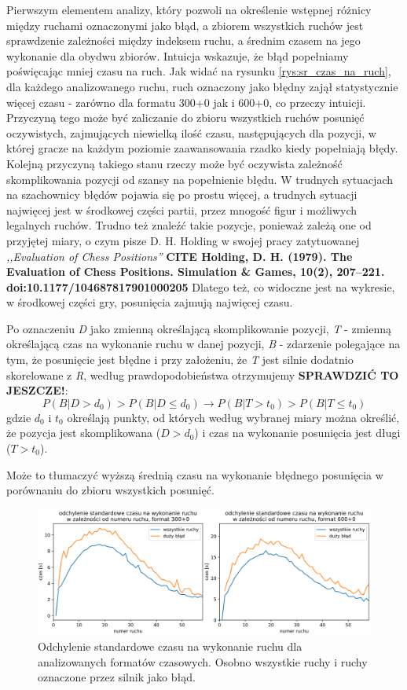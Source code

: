 \documentclass[inzynierska]{pwr_wmat_praca_dyplomowa}
\theoremstyle{plain}
\numberwithin{theorem}{chapter}
\theoremstyle{definition}
\numberwithin{theorem}{chapter}
\begin{document}
Pierwszym elementem analizy, który pozwoli na określenie wstępnej różnicy między ruchami oznaczonymi jako błąd, a zbiorem wszystkich ruchów jest sprawdzenie zależności między indeksem ruchu, a średnim czasem na jego wykonanie dla obydwu zbiorów. Intuicja wskazuje, że błąd popełniamy poświęcając mniej czasu na ruch. Jak widać na rysunku \ref{rys:sr_czas_na_ruch}, dla każdego analizowanego ruchu, ruch oznaczony jako błędny zajął statystycznie więcej czasu - zarówno dla formatu 300+0 jak i 600+0, co przeczy intuicji. 
Przyczyną tego może być zaliczanie do zbioru wszystkich ruchów posunięć oczywistych, zajmujących niewielką ilość czasu, następujących dla pozycji, w której gracze na każdym poziomie zaawansowania rzadko kiedy popełniają błędy.
Kolejną przyczyną takiego stanu rzeczy może być oczywista zależność skomplikowania pozycji od szansy na popełnienie błędu. W trudnych sytuacjach na szachownicy błędów pojawia się po prostu więcej, a trudnych sytuacji najwięcej jest w środkowej części partii, przez mnogość figur i możliwych legalnych ruchów. Trudno też znaleźć takie pozycje, ponieważ zależą one od przyjętej miary, o czym pisze D. H. Holding w swojej pracy zatytuowanej \textit{,,Evaluation of Chess Positions''} \textbf{CITE Holding, D. H. (1979). The Evaluation of Chess Positions. Simulation \& Games, 10(2), 207–221. doi:10.1177/104687817901000205}  Dlatego też, co widoczne jest na wykresie, w środkowej części gry, posunięcia zajmują najwięcej czasu.

Po oznaczeniu \textit{D} jako zmienną określającą skomplikowanie pozycji, \textit{T} - zmienną określającą czas na wykonanie ruchu w danej pozycji, \textit{B} - zdarzenie polegające na tym, że posunięcie jest błędne i przy założeniu, że \textit{T} jest silnie dodatnio skorelowane z \textit{R}, według prawdopodobieństwa otrzymujemy \textbf{SPRAWDZIĆ TO JESZCZE!}:
\begin{equation}
	P(B|D>d_0) > P(B|D\leq d_0) \rightarrow P(B|T>t_0) > P(B|T\leq t_0)
\end{equation}
gdzie $d_0$ i $t_0$ określają punkty, od których według wybranej miary można określić, że pozycja jest skomplikowana ($D>d_0$) i czas na wykonanie posunięcia jest długi ($T>t_0$).


Może to tłumaczyć wyższą średnią czasu na wykonanie błędnego posunięcia w porównaniu do zbioru wszystkich posunięć.
\begin{figure}[H]
	\centering
	\includegraphics[width=\textwidth]{std_czas_na_ruch.png}
	\caption{Odchylenie standardowe czasu na wykonanie ruchu dla analizowanych formatów czasowych. Osobno wszystkie ruchy i ruchy oznaczone przez silnik jako błąd.}
	\label{rys:std_czas_na_ruch}
\end{figure}
\end{document}
